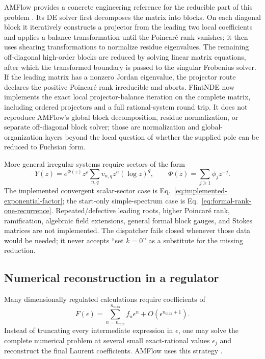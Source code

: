 \documentclass[11pt]{article}
\newcommand{\eps}{\epsilon}
\renewcommand{\_}{\origunderscore\allowbreak}
\begin{document}
AMFlow provides a concrete engineering reference for the reducible part of this problem
\cite{Liu:2022chg,Huang:2026rjb}.  Its DE solver first decomposes the matrix into blocks.  On
each diagonal block it iteratively constructs a projector from the leading two local
coefficients and applies a balance transformation until the Poincar\'e rank vanishes; it then
uses shearing transformations to normalize residue eigenvalues.  The remaining
off-diagonal high-order blocks are reduced by solving linear matrix equations, after which
the transformed boundary is passed to the singular Frobenius solver.  If the leading matrix
has a nonzero Jordan eigenvalue, the projector route declares the positive Poincar\'e rank
irreducible and aborts.  FlintNDE now implements the exact local projector-balance iteration
on the complete matrix, including ordered projectors and a full rational-system round trip.
It does not reproduce AMFlow's global block decomposition, residue normalization, or separate
off-diagonal block solver; those are normalization and global-organization layers beyond the
local question of whether the supplied pole can be reduced to Fuchsian form.

More general irregular systems require sectors of the form
\begin{equation}
  Y(z)=e^{\Phi(z)}z^\rho
  \sum_{n,q}v_{n,q}z^n(\log z)^q,
  \qquad
  \Phi(z)=\sum_{j\geq1}\phi_j z^{-j}.
  \label{eq:irregular-ansatz}
\end{equation}
The implemented convergent scalar-sector case is
Eq.~\eqref{eq:implemented-exponential-factor}; the start-only simple-spectrum case is
Eq.~\eqref{eq:formal-rank-one-recurrence}.  Repeated/defective leading roots, higher
Poincar\'e rank, ramification, algebraic field extensions, general formal block gauges, and
Stokes matrices are not implemented.  The dispatcher fails closed whenever those data would
be needed; it never accepts ``set $k=0$'' as a substitute for the missing reduction.

\subsection{Numerical reconstruction in a regulator}
\label{sec:regulator-reconstruction}
\label{subsec:reconstruction-details}

Many dimensionally regulated calculations require coefficients of
\begin{equation}
  F(\eps)=\sum_{n=n_{\min}}^{n_{\max}}f_n\eps^n+O(\eps^{n_{\max}+1}).
\end{equation}
Instead of truncating every intermediate expression in $\eps$, one may solve the complete
numerical problem at several small exact-rational values $\eps_j$ and reconstruct the final
Laurent coefficients.  AMFlow uses this strategy \cite{Liu:2022chg}.
\end{document}
